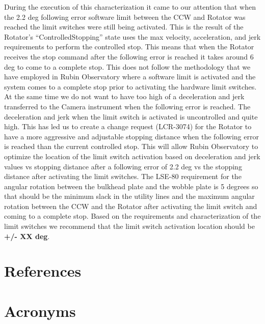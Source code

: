 \documentclass[SE,authoryear,toc]{lsstdoc}
\begin{document}
During the execution of this characterization it came to our attention that when the 2.2 deg following error software limit between the CCW and Rotator was reached the limit switches were still being activated. This is the result of the Rotator’s “ControlledStopping” state uses the max velocity, acceleration, and jerk requirements to perform the controlled stop. This means that when the Rotator receives the stop command after the following error is reached it takes around 6 deg to come to a complete stop. This does not follow the methodology that we have employed in Rubin Observatory where a software limit is activated and the system comes to a complete stop prior to activating the hardware limit switches. At the same time we do not want to have too high of a deceleration and jerk transferred to the Camera instrument when the following error is reached. The deceleration and jerk when the limit switch is activated is uncontrolled and quite high. This has led us to create a change request  (LCR-3074) for the Rotator to have a more aggressive and adjustable stopping distance when the following error is reached than the current controlled stop. This will allow Rubin Observatory to optimize the location of the limit switch activation based on deceleration and jerk values vs stopping distance after a following error of 2.2 deg vs the stopping distance after activating the limit switches. The LSE-80 requirement for the angular rotation between the bulkhead plate and the wobble plate is 5 degrees so that should be the minimum slack in the utility lines and the maximum angular rotation between the CCW and the Rotator after activating the limit switch and coming to a complete stop.
Based on the requirements and characterization of the limit switches we recommend that the limit switch activation location should be {\color{red} \textbf{+/- XX deg}}.
\newpage

\appendix
\section{References} \label{sec:bib}
\renewcommand{\refname}{} %


\section{Acronyms} \label{sec:acronyms}

\end{document}
